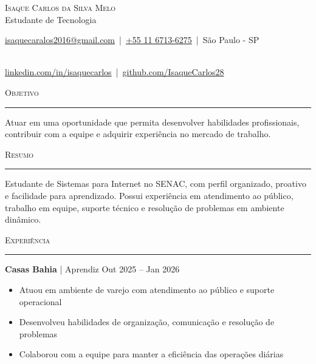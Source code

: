 \documentclass[a4paper]{article}
\newcommand{\header}[1]{
    \vspace{4mm}
    {\large\textsc{#1}}
    
    \vspace{1mm}
    \hrule
    
    \vspace{2mm}
}
\begin{document}

\begin{center}
    {\Huge \scshape Isaque Carlos da Silva Melo}\\
    \vspace{4pt}
    {\Large Estudante de Tecnologia}
\end{center}

\vspace{3mm}

\href{mailto:isaquecaralos2016@gmail.com}{isaquecaralos2016@gmail.com}
\,|\, 
\href{tel:+551167136275}{+55 11 6713-6275}
\,|\, 
São Paulo - SP

\\

\href{https://linkedin.com/in/isaquecarlos}{linkedin.com/in/isaquecarlos}
\,|\, 
\href{https://github.com/IsaqueCarlos28}{github.com/IsaqueCarlos28}


\header{Objetivo}

Atuar em uma oportunidade que permita desenvolver habilidades profissionais, contribuir com a equipe e adquirir experiência no mercado de trabalho.


\header{Resumo}

Estudante de Sistemas para Internet no SENAC, com perfil organizado, proativo e facilidade para aprendizado. Possui experiência em atendimento ao público, trabalho em equipe, suporte técnico e resolução de problemas em ambiente dinâmico.


\header{Experiência}

\textbf{Casas Bahia} | Aprendiz
\hfill Out 2025 -- Jan 2026

\begin{itemize}[leftmargin=*, itemsep=1pt]
    \item Atuou em ambiente de varejo com atendimento ao público e suporte operacional
    \item Desenvolveu habilidades de organização, comunicação e resolução de problemas
    \item Colaborou com a equipe para manter a eficiência das operações diárias
\end{itemize}
\end{document}
